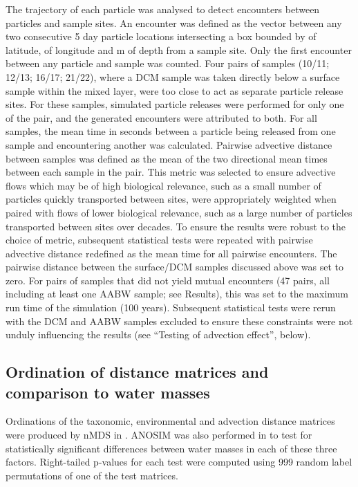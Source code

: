 The trajectory of each particle was analysed to detect encounters between particles and sample sites.
An encounter was defined as the vector between any two consecutive 5 day particle locations intersecting a box bounded by \textdegree{} of latitude, \textdegree{} of longitude and  m of depth from a sample site.
Only the first encounter between any particle and sample was counted. Four pairs of samples (10/11; 12/13; 16/17; 21/22), where a \ac{DCM} sample was taken directly below a surface sample within the mixed layer, were too close to act as separate particle release sites.
For these samples, simulated particle releases were performed for only one of the pair, and the generated encounters were attributed to both. 
For all samples, the mean time in seconds between a particle being released from one sample and encountering another was calculated.
Pairwise advective distance between samples was defined as the mean of the two directional mean times between each sample in the pair.
This metric was selected to ensure advective flows which may be of high biological relevance, such as a small number of particles quickly transported between sites, were appropriately weighted when paired with flows of lower biological relevance, such as a large number of particles transported between sites over decades.
To ensure the results were robust to the choice of metric, subsequent statistical tests were repeated with pairwise advective distance redefined as the mean time for all pairwise encounters.
The pairwise distance between the surface/\ac{DCM} samples discussed above was set to zero.
For pairs of samples that did not yield mutual encounters (47 pairs, all including at least one \ac{AABW} sample; see Results), this was set to the maximum run time of the simulation (100 years).
Subsequent statistical tests were rerun with the \ac{DCM} and \ac{AABW} samples excluded to ensure these constraints were not unduly influencing the results (see ``Testing of advection effect'', below).

\subsection{Ordination of distance matrices and comparison to water masses}

Ordinations of the taxonomic, environmental and advection distance matrices were produced by \ac{nMDS} in .
\ac{ANOSIM} was also performed in  to test for statistically significant differences between water masses in each of these three factors.
Right-tailed p-values for each test were computed using 999 random label permutations of one of the test matrices.

